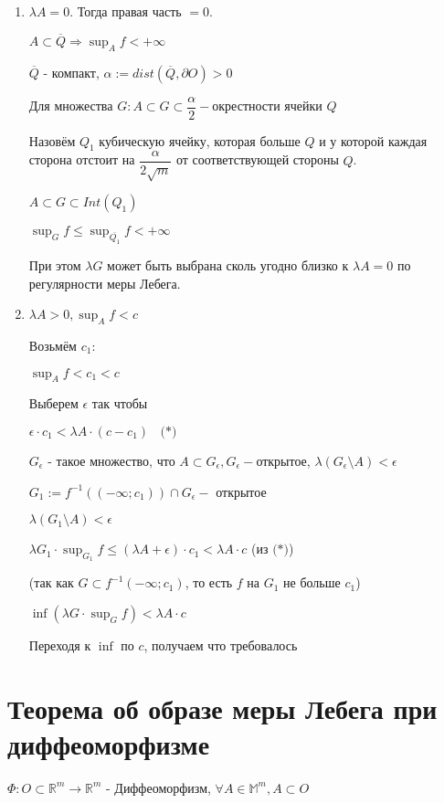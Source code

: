 \documentclass[paper=a4, fontsize=14pt]{report}
\begin{document}
\begin{enumerate}
	\item $\lambda A = 0$. Тогда правая часть $ = 0$.

	$A \subset \overline{Q} \Rightarrow \sup_A f < + \infty$

	$\overline{Q}$ - компакт, $\alpha := dist(\overline{Q}, \partial O) > 0$

	Для множества $G: A \subset G \subset \dfrac{\alpha}{2}-$окрестности ячейки $Q$

	Назовём $Q_1$ кубическую ячейку, которая больше $Q$ и у которой каждая сторона отстоит на $\dfrac{\alpha}{2 \sqrt{m}}$ от соответствующей стороны $Q$.

	$A \subset G \subset Int(Q_1)$

	$\sup_G f \leqslant \sup_{\overline{Q_1}} f < + \infty$

	При этом $\lambda G$ может быть выбрана сколь угодно близко к $\lambda A = 0$ по регулярности меры Лебега.

	\item $\lambda A > 0, \sup_A f < c$

	Возьмём $c_1$:

	$\sup_A f < c_1 < c$

	Выберем $\epsilon$ так чтобы

	$\epsilon \cdot c_1 < \lambda A \cdot (c - c_1) ~~~~ \textbf{(*)}$

	$G_{\epsilon}$ - такое множество, что $A \subset G_{\epsilon}, G_{\epsilon}-$открытое, $\lambda(G_{\epsilon} \setminus A) < \epsilon$

	$G_1 := f^{-1}((- \infty; c_1)) \cap G_{\epsilon} - $ открытое

	$\lambda(G_1 \setminus A) < \epsilon$

	$\lambda G_1 \cdot \sup_{G_1} f \leqslant (\lambda A + \epsilon) \cdot c_1 < \lambda A \cdot c$ (из $\textbf{(*)}$)

	(так как $G \subset f^{-1}(- \infty; c_1)$, то есть $f$ на $G_1$ не больше $c_1$)

	$\inf(\lambda G \cdot \sup_G f) < \lambda A \cdot c$

	Переходя к $\inf$ по $c$, получаем что требовалось
\end{enumerate}


\section{Теорема об образе меры Лебега при диффеоморфизме}
$\Phi: O \subset \mathds{R}^m \rightarrow \mathds{R}^m$ - Диффеоморфизм, $\forall A \in \mathds{M}^m, A \subset O$
\end{document}
